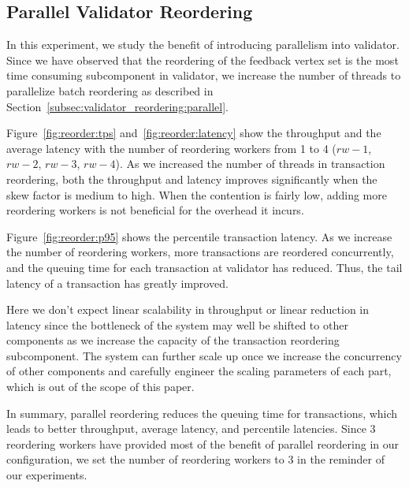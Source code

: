 \subsection{Parallel Validator Reordering}
In this experiment, we study the benefit of introducing parallelism into validator. Since we have observed that the reordering of the feedback vertex set is the most time consuming subcomponent in validator, we increase the number of threads to parallelize batch reordering as described in Section~\ref{subsec:validator_reordering:parallel}. 

Figure~\ref{fig:reorder:tps} and~\ref{fig:reorder:latency} show the throughput and the average latency with the number of reordering workers from 1 to 4 ($rw-1$, $rw-2$, $rw-3$, $rw-4$). As we increased the number of threads in transaction reordering, both the throughput and latency improves significantly when the skew factor is medium to high. When the contention is fairly low, adding more reordering workers is not beneficial for the overhead it incurs.

Figure~\ref{fig:reorder:p95} shows the percentile transaction latency. As we increase the number of reordering workers, more transactions are reordered concurrently, and the queuing time for each transaction at validator has reduced. Thus, the tail latency of a transaction has greatly improved. 

Here we don't expect linear scalability in throughput or linear reduction in latency since the bottleneck of the system may well be shifted to other components as we increase the capacity of the transaction reordering subcomponent. The system can further scale up once we increase the concurrency of other components and carefully engineer the scaling parameters of each part, which is out of the scope of this paper.

In summary, parallel reordering reduces the queuing time for transactions, which leads to better throughput, average latency, and percentile latencies. Since 3 reordering workers have provided most of the benefit of parallel reordering in our configuration, we set the number of reordering workers to 3 in the reminder of our experiments.
